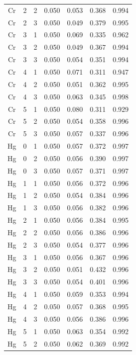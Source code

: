 \documentclass[ms, hidelinks]{uncgdissertationexp}
\theoremstyle{plain}
\theoremstyle{definition}
\theoremstyle{remark}
\begin{document}
\begin{longtable}{ccccccc}
Cr & 2 & 2 & 0.050 & 0.053 & 0.368 & 0.994\\
\rowcolor{gray!6}  Cr & 2 & 3 & 0.050 & 0.049 & 0.379 & 0.995\\
Cr & 3 & 1 & 0.050 & 0.069 & 0.335 & 0.962\\
\rowcolor{gray!6}  Cr & 3 & 2 & 0.050 & 0.049 & 0.367 & 0.994\\
Cr & 3 & 3 & 0.050 & 0.054 & 0.351 & 0.994\\
\rowcolor{gray!6}  Cr & 4 & 1 & 0.050 & 0.071 & 0.311 & 0.947\\
Cr & 4 & 2 & 0.050 & 0.051 & 0.362 & 0.995\\
\rowcolor{gray!6}  Cr & 4 & 3 & 0.050 & 0.063 & 0.345 & 0.998\\
Cr & 5 & 1 & 0.050 & 0.080 & 0.311 & 0.929\\
\rowcolor{gray!6}  Cr & 5 & 2 & 0.050 & 0.054 & 0.358 & 0.996\\
Cr & 5 & 3 & 0.050 & 0.057 & 0.337 & 0.996\\
\rowcolor{gray!6}  Hg & 0 & 1 & 0.050 & 0.057 & 0.372 & 0.997\\
Hg & 0 & 2 & 0.050 & 0.056 & 0.390 & 0.997\\
\rowcolor{gray!6}  Hg & 0 & 3 & 0.050 & 0.057 & 0.371 & 0.997\\
Hg & 1 & 1 & 0.050 & 0.056 & 0.372 & 0.996\\
\rowcolor{gray!6}  Hg & 1 & 2 & 0.050 & 0.054 & 0.384 & 0.996\\
Hg & 1 & 3 & 0.050 & 0.056 & 0.382 & 0.996\\
\rowcolor{gray!6}  Hg & 2 & 1 & 0.050 & 0.056 & 0.384 & 0.995\\
Hg & 2 & 2 & 0.050 & 0.056 & 0.386 & 0.996\\
\rowcolor{gray!6}  Hg & 2 & 3 & 0.050 & 0.054 & 0.377 & 0.996\\
Hg & 3 & 1 & 0.050 & 0.056 & 0.367 & 0.996\\
\rowcolor{gray!6}  Hg & 3 & 2 & 0.050 & 0.051 & 0.432 & 0.996\\
Hg & 3 & 3 & 0.050 & 0.054 & 0.401 & 0.996\\
\rowcolor{gray!6}  Hg & 4 & 1 & 0.050 & 0.059 & 0.353 & 0.994\\
Hg & 4 & 2 & 0.050 & 0.057 & 0.368 & 0.995\\
\rowcolor{gray!6}  Hg & 4 & 3 & 0.050 & 0.056 & 0.386 & 0.996\\
Hg & 5 & 1 & 0.050 & 0.063 & 0.354 & 0.992\\
\rowcolor{gray!6}  Hg & 5 & 2 & 0.050 & 0.062 & 0.369 & 0.992\\

\end{longtable}
\end{document}
